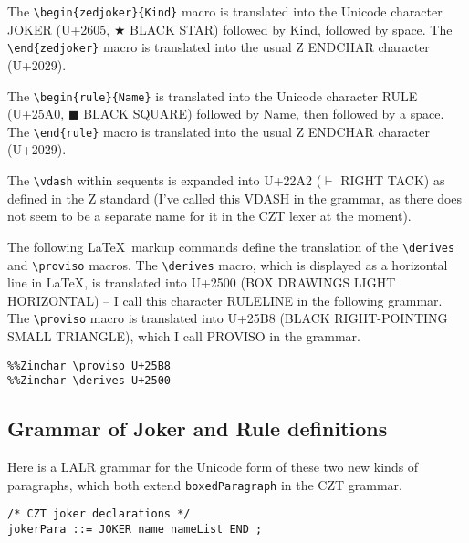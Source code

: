 \documentclass{article}
\newcommand{\derives}{\derive{}}
\newenvironment{zedjoker}[1]{\par$\bigstar$ #1\ }{}
\newcommand{\proviso}{\raisebox{0.5ex}{${}_{\blacktriangleright}\ $}}%
\begin{document}
The \verb!\begin{zedjoker}{Kind}! macro is translated into
the Unicode character JOKER (U+2605, $\bigstar$ BLACK STAR)
followed by Kind, followed by space.
The \verb!\end{zedjoker}! macro is translated into the usual
Z ENDCHAR character (U+2029).

The \verb!\begin{rule}{Name}! is translated into
the Unicode character RULE (U+25A0, $\blacksquare$ BLACK SQUARE)
followed by Name, then followed by a space.
The \verb!\end{rule}! macro is translated into the usual
Z ENDCHAR character (U+2029).

The \verb!\vdash! within sequents is expanded into U+22A2 ($\vdash$ RIGHT TACK)
as defined in the Z standard (I've called this VDASH in the grammar,
as there does not seem to be a separate name for it in the CZT lexer 
at the moment).

The following \LaTeX\ markup commands define the translation
of the \verb!\derives! and \verb!\proviso! macros.
The \verb!\derives! macro, which is displayed as a horizontal line in \LaTeX,
is translated into U+2500 (BOX DRAWINGS LIGHT HORIZONTAL) -- I call this
character RULELINE in the following grammar.  
The \verb!\proviso! macro is translated into U+25B8 (BLACK RIGHT-POINTING
SMALL TRIANGLE), which I call PROVISO in the grammar.


\begin{verbatim}
%%Zinchar \proviso U+25B8
%%Zinchar \derives U+2500
\end{verbatim}

\subsection{Grammar of Joker and Rule definitions}

Here is a LALR grammar for the Unicode form of these two
new kinds of paragraphs, which both extend \verb!boxedParagraph!
in the CZT grammar.
\begin{verbatim}
/* CZT joker declarations */
jokerPara ::= JOKER name nameList END ;
\end{verbatim}
\end{document}
